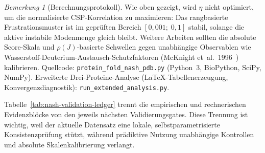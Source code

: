 \documentclass[12pt,a4paper]{article}
\theoremstyle{remark}
\newtheorem{remark}{Bemerkung}
\begin{document}
\begin{remark}[Berechnungsprotokoll]
Wie oben gezeigt, wird $\eta$ nicht optimiert, um die normalisierte CSP-Korrelation zu maximieren: Das rangbasierte Frustrationsmuster ist im geprüften Bereich $[0{,}001;\; 0{,}1]$ stabil, solange die aktive instabile Modenmenge gleich bleibt. Weitere Arbeiten sollten die absolute Score-Skala und $\rho(J)$-basierte Schwellen gegen unabhängige Observablen wie Wasserstoff-Deuterium-Austausch-Schutzfaktoren (McKnight et~al.\ 1996~\cite{McKnight1996}) kalibrieren.
Quellcode: \texttt{protein\_fold\_nash\_pdb.py} (Python~3, BioPython, SciPy, NumPy).
Erweiterte Drei-Proteine-Analyse (LaTeX-Tabellenerzeugung, Konvergenzdiagnostik): \texttt{run\_extended\_analysis.py}.
\end{remark}

Tabelle~\ref{tab:nash-validation-ledger} trennt die empirischen und rechnerischen Evidenzblöcke von den jeweils nächsten Validierungsgates. Diese Trennung ist wichtig, weil der aktuelle Datensatz eine lokale, selbstparametrisierte Konsistenzprüfung stützt, während prädiktive Nutzung unabhängige Kontrollen und absolute Skalenkalibrierung verlangt.
\end{document}

